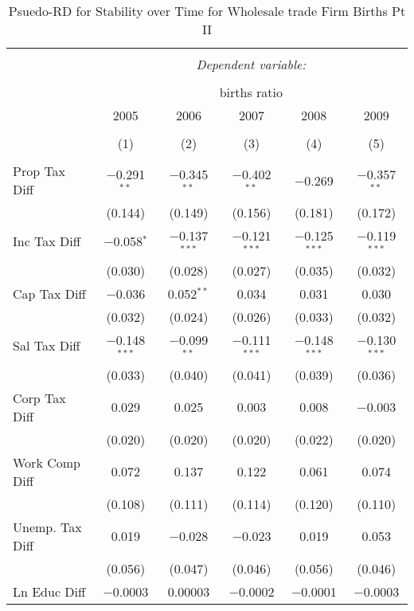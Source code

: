 
\begin{table}[!htbp] \centering 
  \caption{Psuedo-RD for Stability over Time for  Wholesale trade Firm Births Pt II} 
  \label{42year} 
\small 
\begin{tabular}{@{\extracolsep{5pt}}lccccc} 
\\[-1.8ex]\hline 
\hline \\[-1.8ex] 
 & \multicolumn{5}{c}{\textit{Dependent variable:}} \\ 
\cline{2-6} 
\\[-1.8ex] & \multicolumn{5}{c}{births ratio} \\ 
 & 2005 & 2006 & 2007 & 2008 & 2009 \\ 
\\[-1.8ex] & (1) & (2) & (3) & (4) & (5)\\ 
\hline \\[-1.8ex] 
 Prop Tax Diff & $-$0.291$^{**}$ & $-$0.345$^{**}$ & $-$0.402$^{**}$ & $-$0.269 & $-$0.357$^{**}$ \\ 
  & (0.144) & (0.149) & (0.156) & (0.181) & (0.172) \\ 
  Inc Tax Diff & $-$0.058$^{*}$ & $-$0.137$^{***}$ & $-$0.121$^{***}$ & $-$0.125$^{***}$ & $-$0.119$^{***}$ \\ 
  & (0.030) & (0.028) & (0.027) & (0.035) & (0.032) \\ 
  Cap Tax Diff & $-$0.036 & 0.052$^{**}$ & 0.034 & 0.031 & 0.030 \\ 
  & (0.032) & (0.024) & (0.026) & (0.033) & (0.032) \\ 
  Sal Tax Diff & $-$0.148$^{***}$ & $-$0.099$^{**}$ & $-$0.111$^{***}$ & $-$0.148$^{***}$ & $-$0.130$^{***}$ \\ 
  & (0.033) & (0.040) & (0.041) & (0.039) & (0.036) \\ 
  Corp Tax Diff & 0.029 & 0.025 & 0.003 & 0.008 & $-$0.003 \\ 
  & (0.020) & (0.020) & (0.020) & (0.022) & (0.020) \\ 
  Work Comp Diff & 0.072 & 0.137 & 0.122 & 0.061 & 0.074 \\ 
  & (0.108) & (0.111) & (0.114) & (0.120) & (0.110) \\ 
  Unemp. Tax Diff & 0.019 & $-$0.028 & $-$0.023 & 0.019 & 0.053 \\ 
  & (0.056) & (0.047) & (0.046) & (0.056) & (0.046) \\ 
  Ln Educ Diff & $-$0.0003 & 0.00003 & $-$0.0002 & $-$0.0001 & $-$0.0003 \\ 

\end{tabular}
\end{table}
